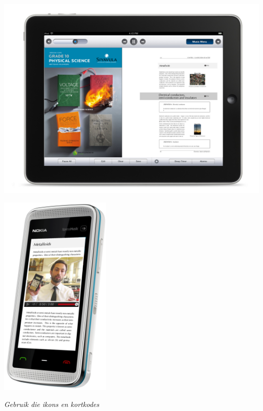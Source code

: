 \begin{center}
\begin{minipage}{0.4\textwidth}
\centering
\includegraphics[width=1\textwidth]{../title_images/ipad.jpg}
\end{minipage}
\begin{minipage}{0.4\textwidth}
\centering
\includegraphics[width=0.4\textwidth]{../title_images/phone.png}
\end{minipage}
\end{center}

\vspace*{2cm}


{\normalfont\sffamily\fontsize{22}\normalfont\itshape Gebruik die ikons en kortkodes} \par

